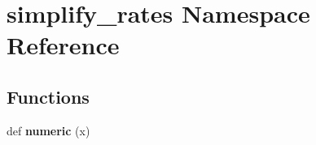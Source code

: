 \hypertarget{namespacesimplify__rates}{}\section{simplify\+\_\+rates Namespace Reference}
\label{namespacesimplify__rates}
\subsection*{Functions}
\begin{DoxyCompactItemize}
\item 
\mbox{\label{namespacesimplify__rates_a6db8f9f3f49dea6899ba0f2a4d35f978}} 
def {\bfseries numeric} (x)
\end{DoxyCompactItemize}
